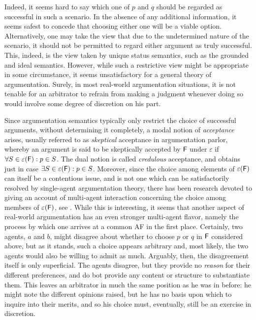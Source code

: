 \documentclass{llncs}
\newcommand{\af}{{\sf F}}
\newcommand{\sem}{\varepsilon}
\begin{document}
Indeed, it seems hard to say which one of $p$ and $q$ should be regarded as successful in such a scenario. In the absence of any additional information, it seems safest to concede that choosing either one will be a viable option. Alternatively, one may take the view that due to the undetermined nature of the scenario, it should not be permitted to regard either argument as truly successful. This, indeed, is the view taken by unique status semantics, such as the grounded and ideal semantics. However, while such a restrictive view might be appropriate in some circumstance, it seems unsatisfactory for a general theory of argumentation. Surely, in most real-world argumentation situations, it is not tenable for an arbitrator to refrain from making a judgment whenever doing so would involve some degree of discretion on his part.

Since argumentation semantics typically only restrict the choice of successful arguments, without determining it completely, a modal notion of \emph{acceptance} arises, usually referred to as \emph{skeptical} acceptance in argumentation parlor, whereby an argument is said to be skeptically accepted by $\af$ under $\sem$ if $\forall S \in \sem(\af): p\in S$. The dual notion is called \emph{credulous} acceptance, and obtains just in case $\exists S \in \sem(\af): p\in S$. Moreover, since the choice among elements of $\sem (\af)$ can itself be a contentious issue, and is not one which can be satisfactorily resolved by single-agent argumentation theory, there has been research devoted to giving an account of multi-agent interaction concerning the choice among members of $\sem(\af)$, see \cite{manipulation,lying}. While this is interesting, it seems that another aspect of real-world argumentation has an even stronger multi-agent flavor, namely the process by which one arrives at a common AF in the first place. Certainly, two agents, $a$ and $b$, might disagree about whether to choose $p$ or $q$ in $\af$ considered above, but as it stands, such a choice appears arbitrary and, most likely, the two agents would also be willing to admit as much. Arguably, then, the disagreement itself is only superficial. The agents disagree, but they provide no \emph{reason} for their different preferences, and do bot provide any content or structure to substantiate them. This leaves an arbitrator in much the same position as he was in before: he might note the different opinions raised, but he has no basis upon which to inquire into their merits, and so his choice must, eventually, still be an exercise in discretion.
\end{document}
